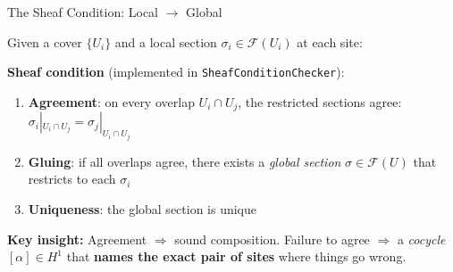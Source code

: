 \documentclass[aspectratio=169,10pt]{beamer}
\newcommand{\Sem}{\mathcal{F}}
\newcommand{\keyinsight}[1]{%
  \vspace{2pt}
  \begin{center}
  \colorbox{sheafbox}{\parbox{0.88\textwidth}{\centering\small\textbf{\textcolor{keyblue}{Key insight:}} #1}}
  \end{center}
  \vspace{-4pt}
}
\begin{document}
\begin{frame}{The Sheaf Condition: Local $\to$ Global}

Given a cover $\{U_i\}$ and a local section $\sigma_i \in \Sem(U_i)$ at each site:

\vspace{0.2em}
\begin{center}
\end{center}

\vspace{0.1em}
{\small
\textbf{Sheaf condition} (implemented in \texttt{SheafConditionChecker}):
\begin{enumerate}
  \item \textbf{Agreement}: on every overlap $U_i \cap U_j$, the restricted
        sections agree: $\sigma_i|_{U_i \cap U_j} = \sigma_j|_{U_i \cap U_j}$
  \item \textbf{Gluing}: if all overlaps agree, there exists a \emph{global section}
        $\sigma \in \Sem(U)$ that restricts to each $\sigma_i$
  \item \textbf{Uniqueness}: the global section is unique
\end{enumerate}
}

\keyinsight{Agreement $\Rightarrow$ sound composition.
Failure to agree $\Rightarrow$ a \emph{cocycle} $[\alpha] \in H^1$
that \textbf{names the exact pair of sites} where things go wrong.}

\end{frame}
\end{document}
